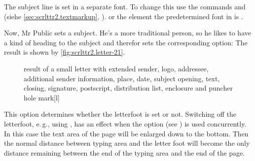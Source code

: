 %
The subject line is set in a separate font. To change this
use the commands  and  (siehe
\autoref{sec:scrlttr2.textmarkup},
). or the element
 the predetermined font
in  is .%
%

\begin{Example}
  Now, Mr Public sets a subject. He's a more traditional person, so he likes
  to have a kind of heading to the subject and therefor sets the corresponding
  option:%
  The result is shown by \autoref{fig:scrlttr2.letter-21}.
  \begin{figure}
    \setcapindent{0pt}%
    \begin{captionbeside}
      {result of a small letter with extended sender, logo, addressee,
        additional sender information, place, date, subject opening, text,
        closing, signature, postscript, distribution list, enclosure and
        puncher hole mark}[l]
    \end{captionbeside}
    \label{fig:scrlttr2.letter-21}
  \end{figure}
\end{Example}
%
%
%
%
%


\begin{Declaration}
\end{Declaration}
%
%
%
This option determines whether the
letterfoot is set or not. Switching off the letterfoot, e.\,g., using
, has
an effect when the option  (see
) is used concurrently. In
this case the text area of the page will be enlarged down to the bottom. Then
the normal distance between typing area and the letter foot will become the
only distance remaining between the end of the typing area and the end of
the page.

